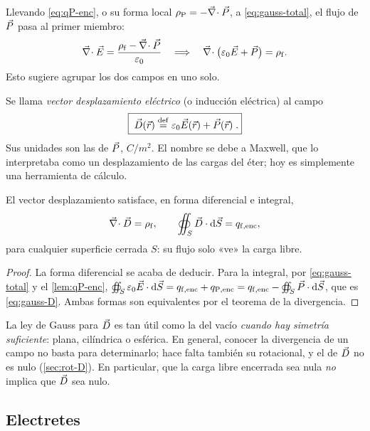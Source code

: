 Llevando \eqref{eq:qP-enc}, o su forma local $\rho_{\mathrm P}=-\vec\nabla\!\cdot\vec P$, a \eqref{eq:gauss-total}, el flujo de $\vec P$ pasa al
primer miembro:
\[
  \vec\nabla\!\cdot\vec E=\frac{\rho_{\mathrm f}-\vec\nabla\!\cdot\vec P}{\varepsilon_0}
  \quad\Longrightarrow\quad
  \vec\nabla\!\cdot\big(\varepsilon_0\vec E+\vec P\big)=\rho_{\mathrm f} .
\]
Esto sugiere agrupar los dos campos en uno solo.

\begin{definicion}\label{def:D}
Se llama \emph{vector desplazamiento eléctrico} (o inducción eléctrica) al campo
\begin{equation}\label{eq:D}
  \boxed{\;\vec D(\vec r)\mathrel{\overset{\mathrm{def}}{=}}\varepsilon_0\vec E(\vec r)+\vec P(\vec r)\; .}
\end{equation}
Sus unidades son las de $\vec P$, $\si{C/m^2}$. El nombre se debe a Maxwell, que lo interpretaba como un
desplazamiento de las cargas del éter; hoy es simplemente una herramienta de cálculo.
\end{definicion}

\begin{teorema}\label{teo:gauss-D}
El vector desplazamiento satisface, en forma diferencial e integral,
\begin{equation}\label{eq:gauss-D}
  \vec\nabla\!\cdot\vec D=\rho_{\mathrm f},\qquad
  \oiint_S\vec D\cdot\mathop{}\!\mathrm{d}\vec S=q_{\mathrm{f,enc}} ,
\end{equation}
para cualquier superficie cerrada $S$: su flujo solo «ve» la carga libre.
\end{teorema}

\begin{proof}
La forma diferencial se acaba de deducir. Para la integral, por \eqref{eq:gauss-total} y el \cref{lem:qP-enc},
$\oiint_S\varepsilon_0\vec E\cdot\mathop{}\!\mathrm{d}\vec S=q_{\mathrm{f,enc}}+q_{\mathrm{P,enc}}=q_{\mathrm{f,enc}}-\oiint_S\vec P\cdot\mathop{}\!\mathrm{d}\vec S$, que es \eqref{eq:gauss-D}. Ambas formas son equivalentes por el
teorema de la divergencia.
\end{proof}

\begin{observacion}\label{obs:D-no-determinado}
La ley de Gauss para $\vec D$ es tan útil como la del vacío \emph{cuando hay simetría suficiente}: plana, cilíndrica
o esférica. En general, conocer la divergencia de un campo no basta para determinarlo; hace falta también su
rotacional, y el de $\vec D$ no es nulo (\cref{sec:rot-D}). En particular, que la carga libre encerrada sea nula
\emph{no} implica que $\vec D$ sea nulo.
\end{observacion}

\subsection{Electretes}\label{sec:electretes}

